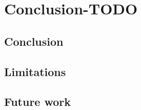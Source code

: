 
\chapter{Conclusion-TODO}
\label{ch:Conclusion}

\section{Conclusion}
\label{sec:Conclusion}

\section{Limitations}
\label{sec:Limitations}

\section{Future work}
\label{sec:FutureWork}
